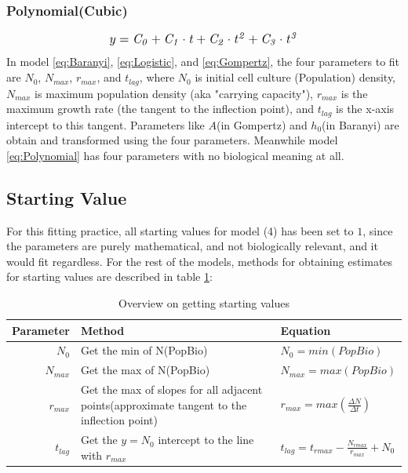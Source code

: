 \documentclass[11pt]{article}
\begin{document}
\subsubsection{Polynomial(Cubic)}
\begin{equation}
\resizebox{.5\hsize}{!}{$y = \it C_{0} + C_{1} \cdot t + C_{2} \cdot t^2 + C_{3} \cdot t ^ 3 $}\label{eq:Polynomial}
\end{equation}
In model \ref{eq:Baranyi}, \ref{eq:Logistic}, and \ref{eq:Gompertz}, the four parameters to fit are $N_{0}$, $N_{max}$, $r_{max}$, and $t_{lag}$, where $N_{0}$ is initial cell culture (Population) density, $N_{max}$ is maximum population density (aka "carrying capacity"), $r_{max}$ is the maximum growth rate (the tangent to the inflection point), and $t_{lag}$ is the x-axis intercept to this tangent. Parameters like $A$(in Gompertz) and $h_{0}$(in Baranyi) are obtain and transformed using the four parameters. Meanwhile model \ref{eq:Polynomial} has four parameters with no biological meaning at all.
\subsection{Starting Value}\label{startingvalue}
For this fitting practice, all starting values for model (4) has been set to $1$, since the parameters are purely mathematical, and not biologically relevant, and it would fit regardless. For the rest of the models, methods for obtaining estimates for starting values are described in table \ref{tab: startingvalue}:
\FloatBarrier
\begin{table}[!htbp]
\begin{tabularx}{\linewidth}{r X X}
\toprule
Parameter & Method & Equation\\
\midrule
$N_{0}$ & Get the min of N(PopBio) & $ N_{0} = min(PopBio)$ \\
$N_{max}$ & Get the max of N(PopBio) & $ N_{max} = max(PopBio)$ \\
$r_{max}$ & Get the max of slopes for all adjacent points(approximate tangent to the inflection point) & $r_{max} = max(\frac{\Delta N}{\Delta t})$ \\
$t_{lag}$ & Get the $y = N_{0}$ intercept to the line with $r_{max}$ & $t_{lag} =  t_{rmax} - \frac{N_{rmax}}{r_{max}} + N_{0}$ \\
\bottomrule
\end{tabularx}
\caption{Overview on getting starting values}
\label{tab: startingvalue}
\end{table}          
\FloatBarrier
\end{document}
